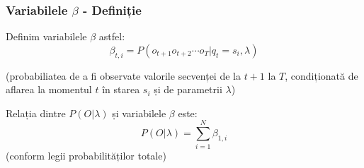 \begin{frame}
  \frametitle{Variabilele $\beta$ - Definiție}
  \begin{block}{}
    Definim variabilele $\beta$ astfel:
    \begin{equation}
      \label{eq:beta}
      \beta_{t,i}=P(o_{t+1} o_{t+2} \cdots o_{T} \vert q_t = s_i,
      \lambda)
    \end{equation}

    (probabiliatea de a fi observate valorile secvenței de la $t+1$ la
    $T$, condiționată de aflarea la momentul $t$ în starea $s_i$ și de
    parametrii $\lambda$)
  \end{block}%
  \pause%
  \begin{block}{}
    Relația dintre $P(O \vert \lambda)$ și variabilele $\beta$ este:
    \begin{equation}
      \label{eq:eq1toalpha}
      P(O \vert \lambda) = \displaystyle\sum_{i=1}^{N}\beta_{1,i}
    \end{equation}
    (conform legii probabilităților totale)
  \end{block}%
\end{frame}

